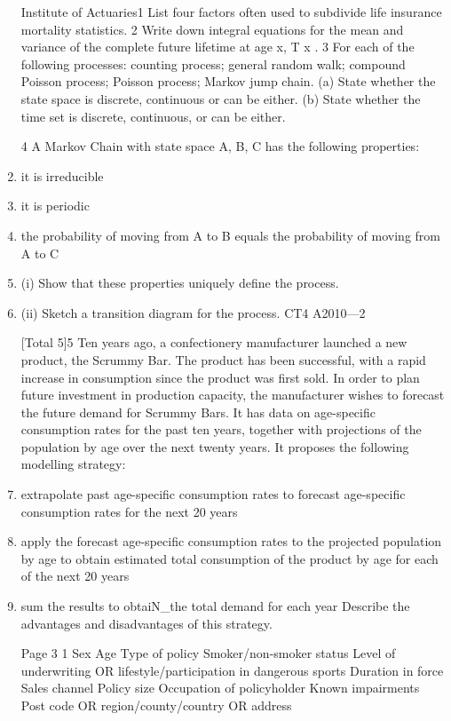 \documentclass[a4paper,12pt]{article}
\begin{document}
\begin{enumerate}
 Institute of Actuaries1 List four factors often used to subdivide life insurance mortality statistics.  
2 Write down integral equations for the mean and variance of the complete future
lifetime at age x, T x .  
3
For each of the following processes:
counting process;
general random walk;
compound Poisson process;
Poisson process;
Markov jump chain.
(a) State whether the state space is discrete, continuous or can be either.
(b) State whether the time set is discrete, continuous, or can be either.
 
4
A Markov Chain with state space {A, B, C} has the following properties:
\item it is irreducible
\item it is periodic
\item the probability of moving from A to B equals the probability of moving from A
to C
\item (i) Show that these properties uniquely define the process.
\item (ii) Sketch a transition diagram for the process.
CT4 A2010—2

 
[Total 5]5
Ten years ago, a confectionery manufacturer launched a new product, the Scrummy
Bar. The product has been successful, with a rapid increase in consumption since the product was first sold. In order to plan future investment in production capacity, the
manufacturer wishes to forecast the future demand for Scrummy Bars. It has data on age-specific consumption rates for the past ten years, together with projections of the
population by age over the next twenty years. It proposes the following modelling strategy:
\item extrapolate past age-specific consumption rates to forecast age-specific consumption rates for the next 20 years
\item apply the forecast age-specific consumption rates to the projected population by
age to obtain estimated total consumption of the product by age for each of the
next 20 years
\item sum the results to obtaiN_the total demand for each year
Describe the advantages and disadvantages of this strategy.

\newpage

Page 3 %
1
Sex
Age
Type of policy
Smoker/non-smoker status
Level of underwriting OR lifestyle/participation in dangerous sports
Duration in force
Sales channel
Policy size
Occupation of policyholder
Known impairments
Post code OR region/county/country OR address


\end{enumerate}
\end{document}
